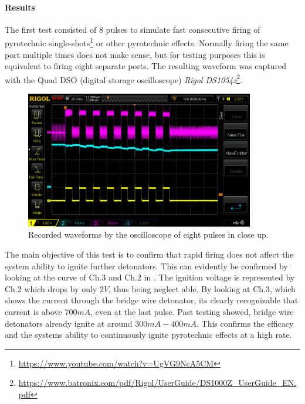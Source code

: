 \paragraph{Results}
\label{Results}

\noindent The first test consisted of 8 pulses to simulate fast consecutive firing of pyrotechnic single-shots\footnote{\url{https://www.youtube.com/watch?v=UgVG9NcA5CM}} or other pyrotechnic effects. Normally firing the same port multiple times does not make sense, but for testing purposes this is equivalent to firing eight separate ports. The resulting waveform was captured with the Quad DSO (digital storage oscilloscope) \textit{Rigol DS1054z}\footnote{\url{https://www.batronix.com/pdf/Rigol/UserGuide/DS1000Z_UserGuide_EN.pdf}}.\\

\begin{figure}[!ht]
    \centering
    \includegraphics[width=10cm]{./Figures/eight_pulses_close.png}
    \caption{Recorded waveforms by the oscilloscope of eight pulses in close up.}
    \label{fig:eight_pulses_close}     
\end{figure}
 
\noindent The main objective of this test is to confirm that rapid firing does not affect the system ability to ignite further detonators. This can evidently be confirmed by looking at the curve of Ch.3 and Ch.2 in . The ignition voltage is represented by Ch.2 which drops by only $2V$, thus being neglect able. By looking at Ch.3, which shows the current through the bridge wire detonator, its clearly recognizable that current is above $700mA$, even at the last pulse. Past testing showed, bridge wire detonators already ignite at around $300mA-400mA$. This confirms the efficacy and the systems ability to continuously ignite pyrotechnic effects at a high rate.

\pagebreak


